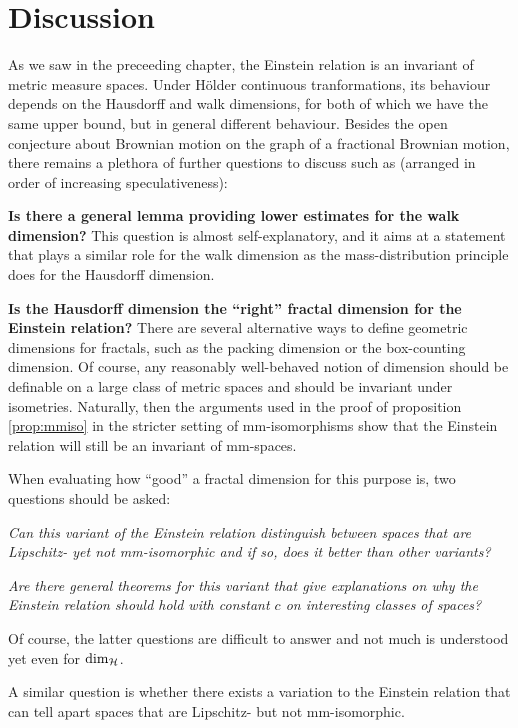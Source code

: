 \chapter*{Discussion}

As we saw in the preceeding chapter, the Einstein relation is an invariant of metric measure spaces. Under H\"older continuous tranformations, its behaviour depends on the Hausdorff and walk dimensions, for both of which we have the same upper bound, but in general different behaviour. Besides the open conjecture about Brownian motion on the graph of a fractional Brownian motion, there remains a plethora of further questions to discuss such as (arranged in order of increasing speculativeness):

\textbf{Is there a general lemma providing lower estimates for the walk dimension?} This question is almost self-explanatory, and it aims at a statement that plays a similar role for the walk dimension as the mass-distribution principle does for the Hausdorff dimension.

\textbf{Is the Hausdorff dimension the ``right'' fractal dimension for the Einstein relation?} There are several alternative ways to define geometric dimensions for fractals, such as the packing dimension or the box-counting dimension. Of course, any reasonably well-behaved notion of dimension should be definable on a large class of metric spaces and should be invariant under isometries. Naturally, then the arguments used in the proof of proposition \ref{prop:mmiso} in the stricter setting of mm-isomorphisms show that the Einstein relation will still be an invariant of mm-spaces. 
  
When evaluating how ``good'' a fractal dimension for this purpose is, two questions should be asked: 
\begin{compactenum}
  \item \emph{Can this variant of the Einstein relation distinguish between spaces that are Lipschitz- yet not mm-isomorphic and if so, does it better than other variants?}
  \item \emph{Are there general theorems for this variant that give explanations on why the Einstein relation should hold with constant $c$ on interesting classes of spaces?}
\end{compactenum}
Of course, the latter questions are difficult to answer and not much is understood yet even for $\dim_{\mathcal{H}}$. 

A similar question is whether there exists a variation to the Einstein relation that can tell apart spaces that are Lipschitz- but not mm-isomorphic.


